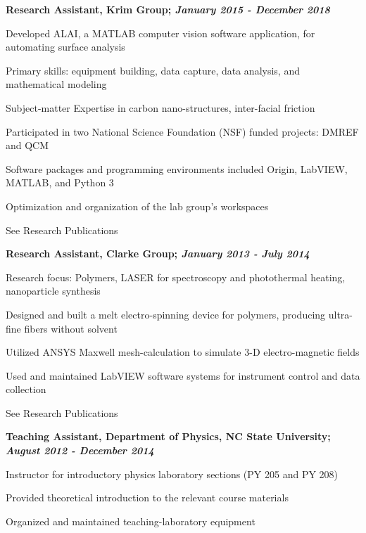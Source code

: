 \documentclass[letterpaper,final]{memoir}
\newcommand{\Sep}{\vspace{1.0em}}
\newcommand{\SmallSep}{\vspace{0.4em}}
\newcommand{\CVItem}[1]
	{\textbf{\color{Blue} #1}}
\begin{document}
\CVItem{Research Assistant, Krim Group; \textit{January 2015 - December 2018}}
\begin{compactitem}[\color{Blue}$\circ$]
   
    \SmallSep

    \item Developed ALAI, a MATLAB computer vision software application, for automating surface analysis
    \item Primary skills: equipment building, data capture, data analysis, and mathematical modeling
    \item Subject-matter Expertise in carbon nano-structures, inter-facial friction
    \item Participated in two National Science Foundation (NSF) funded projects: DMREF and QCM
    \item Software packages and programming environments included Origin, LabVIEW, MATLAB, and Python 3
    \item Optimization and organization of the lab group's workspaces
    \item See Research Publications

\end{compactitem}
\Sep

\CVItem{Research Assistant, Clarke Group; \textit{January 2013 - July 2014}}
\begin{compactitem}[\color{Blue}$\circ$]
    
    \SmallSep

    \item Research focus: Polymers, LASER for spectroscopy and photothermal heating, nanoparticle synthesis
    \item Designed and built a melt electro-spinning device for polymers, producing ultra-fine fibers without solvent
    \item Utilized ANSYS Maxwell mesh-calculation to simulate 3-D electro-magnetic fields
    \item Used and maintained LabVIEW software systems for instrument control and data collection
    \item See Research Publications

\end{compactitem}

\Sep

\CVItem{Teaching Assistant, Department of Physics, NC State University; \textit{August 2012 - December 2014}}
\begin{compactitem}[\color{Blue}$\circ$]

    \SmallSep
	
    \item Instructor for introductory physics laboratory sections (PY 205 and PY 208)
    \item Provided theoretical introduction to the relevant course materials
    \item Organized and maintained teaching-laboratory equipment
    
\end{compactitem}
\end{document}
